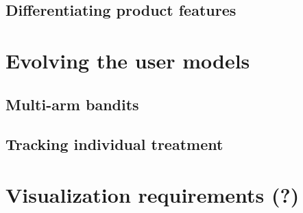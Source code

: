 
\subsection{Differentiating product features} %
\label{sec:differentiating_product_features}


\section{Evolving the user models} %
\label{sec:evolving_the_user_models}

\subsection{Multi-arm bandits}

\subsection{Tracking individual treatment}


\section{Visualization requirements (?)} %
\label{sec:visualization_requirements}

